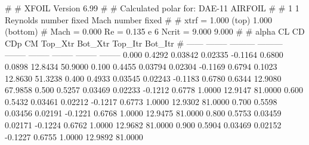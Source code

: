 #  
#       XFOIL         Version 6.99
#  
# Calculated polar for: DAE-11 AIRFOIL                                  
#  
# 1 1 Reynolds number fixed          Mach number fixed         
#  
# xtrf =   1.000 (top)        1.000 (bottom)  
# Mach =   0.000     Re =     0.135 e 6     Ncrit =   9.000  9.000
#  
#   alpha    CL        CD       CDp       CM     Top_Xtr  Bot_Xtr  Top_Itr  Bot_Itr
#  ------ -------- --------- --------- -------- -------- -------- -------- --------
   0.000   0.4292   0.03842   0.02335  -0.1164   0.6800   0.0898  12.8434  50.9000
   0.100   0.4455   0.03794   0.02304  -0.1169   0.6794   0.1023  12.8630  51.3238
   0.400   0.4933   0.03545   0.02243  -0.1183   0.6780   0.6344  12.9080  67.9858
   0.500   0.5257   0.03469   0.02233  -0.1212   0.6778   1.0000  12.9147  81.0000
   0.600   0.5432   0.03461   0.02212  -0.1217   0.6773   1.0000  12.9302  81.0000
   0.700   0.5598   0.03456   0.02191  -0.1221   0.6768   1.0000  12.9475  81.0000
   0.800   0.5753   0.03459   0.02171  -0.1224   0.6762   1.0000  12.9682  81.0000
   0.900   0.5904   0.03469   0.02152  -0.1227   0.6755   1.0000  12.9892  81.0000

